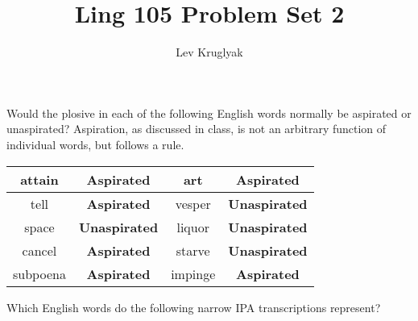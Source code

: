 \documentclass{../../templates/lkx_pset}
\title{Ling 105 Problem Set 2}
\author{Lev Kruglyak}
\begin{document}
\maketitle

\begin{problem}{1}
Would the plosive in each of the following English words normally be aspirated or unaspirated? Aspiration, as discussed in class, is not an arbitrary function of individual words, but follows a rule.
\end{problem}

\begin{solution}
	\begin{center}
		\begin{tabular}{|c|c|c|c|}
			\hline
			attain   & \textbf{Aspirated}   & art     & \textbf{Aspirated}   \\
			\hline
			tell     & \textbf{Aspirated}   & vesper  & \textbf{Unaspirated}   \\
			\hline
			space    & \textbf{Unaspirated} & liquor  & \textbf{Unaspirated} \\
			\hline
			cancel   & \textbf{Aspirated} & starve  & \textbf{Unaspirated} \\
			\hline
			subpoena & \textbf{Aspirated}   & impinge & \textbf{Aspirated}   \\
			\hline
		\end{tabular}
	\end{center}
\end{solution}

\begin{problem}{2}
Which English words do the following narrow IPA transcriptions represent?
\end{problem}
\end{document}
